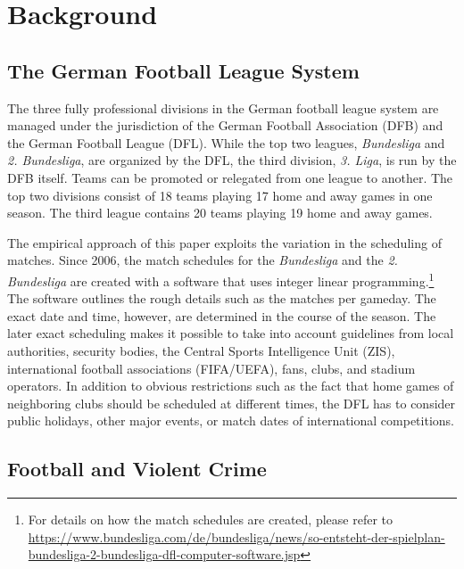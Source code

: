\section{Background}\label{sec_soc_ext:background}



\subsection{The German Football League System}
The three fully professional divisions in the German football league system are managed under the jurisdiction of the German Football Association (DFB) and the German Football League (DFL). While the top two leagues, \textit{Bundesliga} and \textit{2. Bundesliga}, are organized by the DFL, the third division, \textit{3. Liga}, is run by the DFB itself. Teams can be promoted or relegated from one league to another. The top two divisions consist of 18 teams playing 17 home and away games in one season. The third league contains 20 teams playing 19 home and away games.

The empirical approach of this paper exploits the variation in the scheduling of matches. Since 2006, the match schedules for the \textit{Bundesliga} and the \textit{2. Bundesliga} are created with a software that uses integer linear programming.\footnote{For details on how the match schedules are created, please refer to \href{https://www.bundesliga.com/de/bundesliga/news/so-entsteht-der-spielplan-bundesliga-2-bundesliga-dfl-computer-software.jsp}{https://www.bundesliga.com/de/bundesliga/news/so-entsteht-der-spielplan-bundesliga-2-bundesliga-dfl-computer-software.jsp}} The software outlines the rough details such as the matches per gameday. The exact date and time, however, are determined in the course of the season. The later exact scheduling makes it possible to take into account guidelines from local authorities, security bodies, the Central Sports Intelligence Unit (ZIS), international football associations (FIFA/UEFA), fans, clubs, and stadium operators. In addition to obvious restrictions such as the fact that home games of neighboring clubs should be scheduled at different times, the DFL has to consider public holidays, other major events, or match dates of international competitions.



\subsection{Football and Violent Crime}

